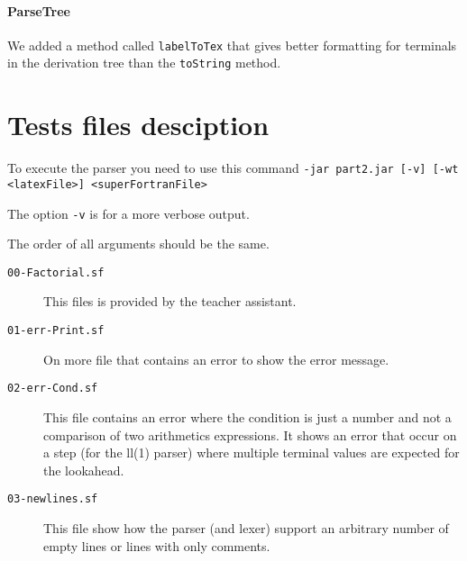 \documentclass[12pt]{article}
\begin{document}
\paragraph{ParseTree}
We added a method called \texttt{labelToTex} that gives better formatting for terminals in the
derivation tree than the \texttt{toString} method.


\section{Tests files desciption}
To execute the parser you need to use this command \texttt{-jar part2.jar [-v] [-wt <latexFile>] <superFortranFile>}

The option \texttt{-v} is for a more verbose output.

The order of all arguments should be the same.

\begin{description}
	\item[\texttt{00-Factorial.sf}] This files is provided by the teacher assistant.
	\item[\texttt{01-err-Print.sf}] On more file that contains an error
	      to show the error message.
	\item[\texttt{02-err-Cond.sf}]
	      This file contains an error where the condition is
	      just a number and not a comparison of two arithmetics expressions.
	      It shows an error that occur on a step (for the ll(1) parser)
	      where multiple terminal values are expected for the lookahead.
	\item[\texttt{03-newlines.sf}] This file show how the parser
	      (and lexer) support an arbitrary number of empty lines or lines with only comments.
\end{description}
\end{document}
